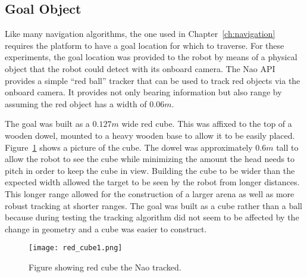 \subsection{Goal Object}
Like many navigation algorithms, the one used in Chapter~\ref{ch:navigation}
requires the platform to have a goal location for which to traverse.
For these experiments, the goal location was provided to the robot by means
of a physical object that the robot could detect with its onboard camera.
The Nao API provides a simple ``red ball'' tracker that can be used to track
red objects via the onboard camera. It provides not only bearing information
but also range by assuming the red object has a width of $0.06 m$.

The goal was built as a $0.127 m$ wide red cube. 
This was affixed to the top of a wooden dowel, mounted to a heavy wooden base to 
allow it to be easily placed.
Figure~\ref{fig:red_cube1} shows a picture of the cube.
The dowel was approximately $0.6 m$ tall to allow the robot to see the cube
while minimizing the amount the head needs to pitch in order to keep 
the cube in view. Building the cube to be wider than the 
expected width allowed the target to be seen by the robot from longer distances. 
This longer range allowed for the construction of a larger arena as well as more 
robust tracking at shorter ranges.
The goal was built as a cube rather than a ball because during testing 
the tracking algorithm did not seem to be affected by the change in geometry 
and a cube was easier to construct. 

\begin{figure}
\centering
\texttt{[image: red\_cube1.png]}
\caption{Figure showing red cube the Nao tracked.}
\label{fig:red_cube1}
\end{figure}
